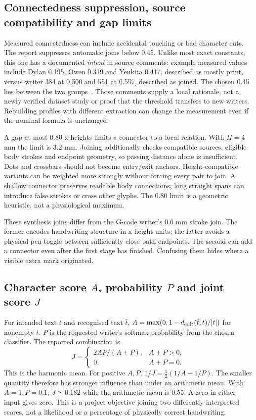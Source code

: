 \subsection{Connectedness suppression, source compatibility and gap limits}
Measured connectedness can include accidental touching or bad character cuts.
The report suppresses automatic joins below 0.45. Unlike most exact constants,
this one has a documented \emph{intent} in source comments: example measured
values include Dylan 0.195, Owen 0.319 and Yeukita 0.417, described as mostly
print, versus writer 384 at 0.500 and 551 at 0.557, described as joined.
The chosen 0.45 lies between the two groups~\cite{code2026}.
Those comments supply a local rationale, not a newly verified dataset study
or proof that the threshold transfers to new writers. Rebuilding profiles
with different extraction can change the measurement even if the nominal
formula is unchanged.

A gap at most 0.80 x-heights limits a connector to a local relation. With
$H=4$ mm the limit is 3.2 mm. Joining additionally checks compatible sources,
eligible body strokes and endpoint geometry, so passing distance alone is
insufficient. Dots and crossbars should not become entry/exit anchors.
Height-compatible variants can be weighted more strongly without forcing
every pair to join. A shallow connector preserves readable body connections;
long straight spans can introduce false strokes or cross other glyphs.
The 0.80 limit is a geometric heuristic, not a physiological maximum.

These synthesis joins differ from the G-code writer's 0.6 mm stroke join.
The former encodes handwriting structure in x-height units; the latter
avoids a physical pen toggle between sufficiently close path endpoints.
The second can add a connector even after the first stage has finished.
Confusing them hides where a visible extra mark originated.

\subsection{Character score $A$, probability $P$ and joint score $J$}
For intended text $t$ and recognised text $\hat t$,
$A=\max(0,1-d_{\rm edit}(\hat t,t)/|t|)$ for nonempty $t$.
$P$ is the requested writer's softmax probability from the chosen classifier.
The reported combination is
\[
J=\begin{cases}2AP/(A+P),&A+P>0,\\0,&A+P=0.\end{cases}
\]
This is the harmonic mean. For positive $A,P$,
$1/J=\tfrac12(1/A+1/P)$. The smaller quantity therefore has stronger
influence than under an arithmetic mean. With $A=1,P=0.1$, $J\simeq0.182$
while the arithmetic mean is 0.55. A zero in either input gives zero.
This is a project objective joining two differently interpreted scores,
not a likelihood or a percentage of physically correct handwriting.


